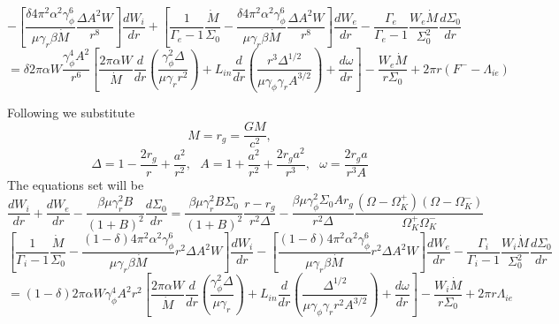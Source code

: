 \documentclass[12pt]{book}
\begin{document}
\begin{equation}\nonumber
-\left[\frac{\delta4\pi^2\alpha^2\gamma_\phi^6}{\mu\gamma_r\beta\dot M}\frac{\Delta A^2W}{r^8}\right]\frac{dW_i}{dr}+
\left[\frac{1}{\Gamma_e-1}\frac{\dot M}{\Sigma_0}
-\frac{\delta4\pi^2\alpha^2\gamma_\phi^6}{\mu\gamma_r\beta\dot M}\frac{\Delta A^2W}{r^8}\right]\frac{dW_e}{dr}
-\frac{\Gamma_e}{\Gamma_e-1}\frac{W_e\dot M}{\Sigma_0^2}\frac{d\Sigma_0}{dr}
\end{equation}
\begin{equation}
=\delta2\pi\alpha W\frac{\gamma_\phi^4A^2}{r^6}
\left[\frac{2\pi\alpha W}{\dot M}\frac{d}{dr}\left(\frac{\gamma_\phi^2\Delta}{\mu\gamma_rr^2}\right)
+L_{in}\frac{d}{dr}\left(\frac{r^3\Delta^{1/2}}{\mu\gamma_\phi\gamma_r A^{3/2}}\right)
+\frac{d\omega}{dr}
\right]
-\frac{W_e\dot M}{r\Sigma_0}+2\pi r (F^--\Lambda_{ie})
\end{equation}

Following we substitute 
\begin{equation}
M=r_g=\frac{GM}{c^2},
\end{equation}
\begin{equation}
 \Delta=1-\frac{2r_g}{r}+\frac{a^2}{r^2},~~~A=1+\frac{a^2}{r^2}+\frac{2r_ga^2}{r^3},~~~\omega=\frac{2r_ga}{r^3A}
\end{equation}
The equations set will be
\begin{equation}
\frac{dW_i}{dr} + \frac{dW_e}{dr} -\frac{\beta\mu\gamma_r^2B}{(1+B)^2}\frac{d\Sigma_0}{dr}=
\frac{\beta\mu\gamma_r^2B\Sigma_0}{(1+B)^2}\frac{r-r_g}{r^2\Delta}
-\frac{\beta\mu\gamma_\phi^2\Sigma_0Ar_g}{r^2\Delta}\frac{(\Omega-\Omega_K^+)(\Omega-\Omega_K^-)}{\Omega_K^+\Omega_K^-}
\end{equation}
\begin{equation}\nonumber
\left[\frac{1}{\Gamma_i-1}\frac{\dot M}{\Sigma_0}
-\frac{(1-\delta)4\pi^2\alpha^2\gamma_\phi^6}{\mu\gamma_r\beta\dot M}r^2\Delta A^2W\right]\frac{dW_i}{dr}
-\left[\frac{(1-\delta)4\pi^2\alpha^2\gamma_\phi^6}{\mu\gamma_r\beta\dot M}r^2\Delta A^2W\right]\frac{dW_e}{dr}
-\frac{\Gamma_i}{\Gamma_i-1}\frac{W_i\dot M}{\Sigma_0^2}\frac{d\Sigma_0}{dr}
\end{equation}
\begin{equation}
=(1-\delta)2\pi\alpha W\gamma_\phi^4A^2r^2
\left[\frac{2\pi\alpha W}{\dot M}\frac{d}{dr}\left(\frac{\gamma_\phi^2\Delta}{\mu\gamma_r}\right)
+L_{in}\frac{d}{dr}\left(\frac{\Delta^{1/2}}{\mu\gamma_\phi\gamma_r r^2A^{3/2}}\right)
+\frac{d\omega}{dr}
\right]
-\frac{W_i\dot M}{r\Sigma_0}+2\pi r \Lambda_{ie}
\end{equation}
\end{document}
